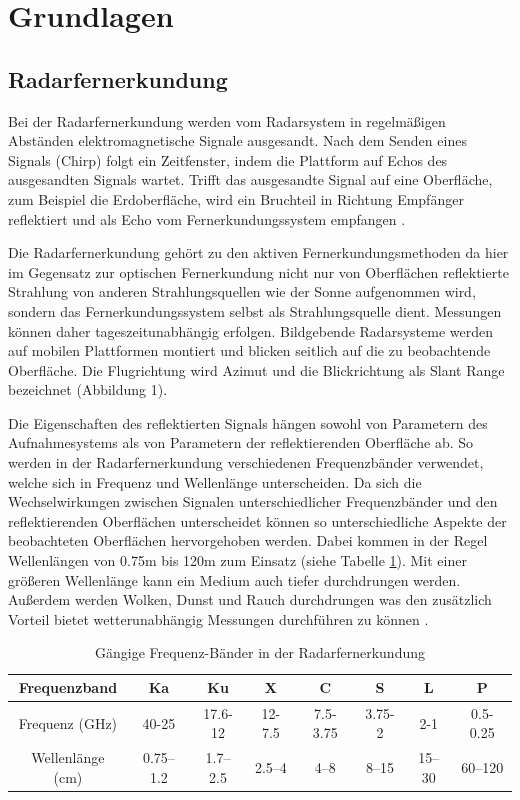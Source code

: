 \newpage
\restoregeometry
\section{Grundlagen}
\subsection{Radarfernerkundung}
Bei der Radarfernerkundung werden vom Radarsystem in regelmäßigen Abständen elektromagnetische Signale ausgesandt. Nach dem Senden eines Signals 
(Chirp) folgt ein Zeitfenster, indem die Plattform auf Echos des ausgesandten Signals wartet.
Trifft das ausgesandte Signal auf eine Oberfläche, zum Beispiel 
die Erdoberfläche, wird ein Bruchteil in Richtung Empfänger reflektiert und als Echo vom Fernerkundungssystem empfangen \cite{tutorial_on_sar}.

Die Radarfernerkundung gehört zu den aktiven Fernerkundungsmethoden da hier im Gegensatz zur optischen Fernerkundung nicht nur 
von Oberflächen reflektierte Strahlung von anderen Strahlungsquellen wie der Sonne aufgenommen wird, sondern das Fernerkundungssystem 
selbst als Strahlungsquelle dient. Messungen können daher tageszeitunabhängig erfolgen. Bildgebende Radarsysteme werden auf mobilen Plattformen 
montiert und blicken seitlich auf die zu beobachtende Oberfläche. Die Flugrichtung wird Azimut und die Blickrichtung als Slant Range 
bezeichnet \cite{tutorial_on_sar} (Abbildung 1). 

Die Eigenschaften des reflektierten Signals hängen sowohl von Parametern des Aufnahmesystems als von Parametern der reflektierenden Oberfläche ab.
So werden in der Radarfernerkundung verschiedenen Frequenzbänder verwendet, welche sich in Frequenz und Wellenlänge unterscheiden. Da sich die Wechselwirkungen zwischen Signalen 
unterschiedlicher Frequenzbänder und den reflektierenden Oberflächen unterscheidet können so unterschiedliche Aspekte der beobachteten Oberflächen hervorgehoben werden. 
Dabei kommen in der Regel Wellenlängen von 0.75m bis 120m zum Einsatz (siehe Tabelle \ref{frequenzbaender}).
Mit einer größeren Wellenlänge kann ein Medium auch tiefer durchdrungen werden. Außerdem werden Wolken, Dunst und Rauch durchdrungen was den zusätzlich Vorteil bietet
wetterunabhängig Messungen durchführen zu können \cite{einfuehrung_in_fernerkundung}.

\begin{table}[H]
    \caption{Gängige Frequenz-Bänder in der Radarfernerkundung \cite{tutorial_on_sar}}
    \centering
    \begin{tabular}{c|c c c c c c c } 
        Frequenzband & Ka & Ku & X & C & S & L & P\\ 
        \hline
        Frequenz (GHz) & 40-25 & 17.6-12 & 12-7.5 & 7.5-3.75 & 3.75-2 & 2-1 & 0.5-0.25\\ 
        Wellenlänge (cm) & 0.75–1.2 & 1.7–2.5 & 2.5–4 & 4–8 & 8–15 & 15–30 & 60–120\\ 
    \end{tabular}
    \label{frequenzbaender}
\end{table}

